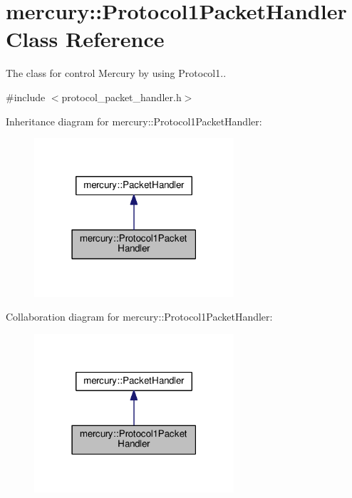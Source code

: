 \hypertarget{classmercury_1_1_protocol1_packet_handler}{}\section{mercury\+:\+:Protocol1\+Packet\+Handler Class Reference}
\label{classmercury_1_1_protocol1_packet_handler}


The class for control Mercury by using Protocol1..  




{\ttfamily \#include $<$protocol\+\_\+packet\+\_\+handler.\+h$>$}



Inheritance diagram for mercury\+:\+:Protocol1\+Packet\+Handler\+:
\nopagebreak
\begin{figure}[H]
\begin{center}
\leavevmode
\includegraphics[width=210pt]{classmercury_1_1_protocol1_packet_handler__inherit__graph}
\end{center}
\end{figure}


Collaboration diagram for mercury\+:\+:Protocol1\+Packet\+Handler\+:
\nopagebreak
\begin{figure}[H]
\begin{center}
\leavevmode
\includegraphics[width=210pt]{classmercury_1_1_protocol1_packet_handler__coll__graph}
\end{center}
\end{figure}
